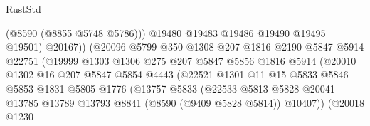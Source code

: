 \begin{lexlean}{RustStd}
\begin{coremodule}
                                        (@8590 (@8855 @5748 @5786)))
                                      @19480
                                      @19483
                                      @19486
                                      @19490
                                      @19495
                                      @19501)
                                    @20167))
                                (@20096
                                  @5799
                                  @350
                                  @1308
                                  @207
                                  @1816
                                  @2190
                                  @5847
                                  @5914
                                  @22751
                                  (@19999
                                    @1303
                                    @1306
                                    @275
                                    @207
                                    @5847
                                    @5856
                                    @1816
                                    @5914
                                    (@20010
                                      @1302
                                      @16
                                      @207
                                      @5847
                                      @5854
                                      @4443
                                      (@22521
                                        @1301
                                        @11
                                        @15
                                        @5833
                                        @5846
                                        @5853
                                        @1831
                                        @5805
                                        @1776
                                        (@13757
                                          @5833
                                          (@22533
                                            @5813
                                            @5828
                                            @20041
                                            @13785
                                            @13789
                                            @13793
                                            @8841
                                            (@8590 (@9409 @5828 @5814))
                                            @10407))
                                        (@20018
                                          @1230

\end{coremodule}
\end{lexlean}
